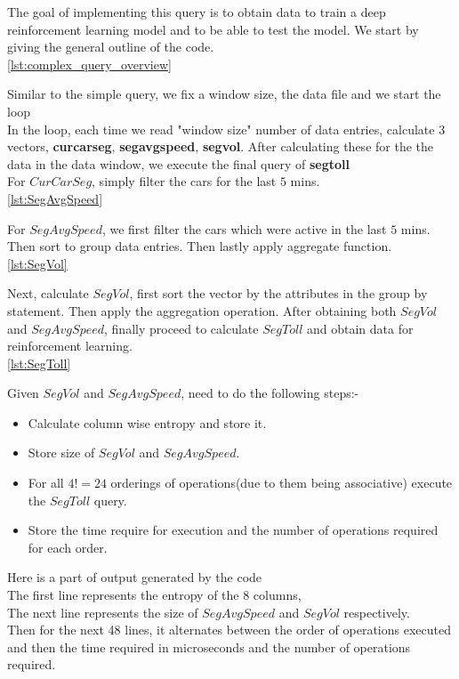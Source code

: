 The goal of implementing this query is to obtain data to train a deep reinforcement learning model and to be able to test the model. We start by giving the general outline of the code. \\
\ref{lst:complex_query_overview}
\par Similar to the simple query, we fix a window size, the data file and we start the loop\\
In the loop, each time we read "window size" number of data entries, calculate $3$ vectors, \textbf{curcarseg}, \textbf{segavgspeed}, \textbf{segvol}. After calculating these for the the data in the data window, we execute the final query of \textbf{segtoll}\\
For $CurCarSeg$, simply filter the cars for the last $5$ mins.\\
\ref{lst:SegAvgSpeed}
\par For $SegAvgSpeed$, we first filter the cars which were active in the last $5$ mins.\\
Then sort to group data entries. Then lastly apply aggregate function.\\ 
\ref{lst:SegVol}
\par Next, calculate $SegVol$, first sort the vector by the attributes in the group by statement. Then apply the aggregation operation.
After obtaining both $SegVol$ and $SegAvgSpeed$, finally proceed to calculate $SegToll$ and obtain data for reinforcement learning.\\
\ref{lst:SegToll}
\par Given $SegVol$ and $SegAvgSpeed$,  need to do the following steps:-
\begin{itemize}
    \item Calculate column wise entropy and store it.
    \item Store size of $SegVol$ and $SegAvgSpeed$.
    \item For all $4!=24$ orderings of operations(due to them being associative) execute the $SegToll$ query.
    \item Store the time require for execution and the number of operations required for each order.
\end{itemize}
Here is a part of output generated by the code\\
The first line represents the entropy of the $8$ columns,\\
The next line represents the size of $SegAvgSpeed$ and $SegVol$ respectively.\\
Then for the next 48 lines, it alternates between the order of operations executed and then the time required in microseconds and the number of operations required.\\
